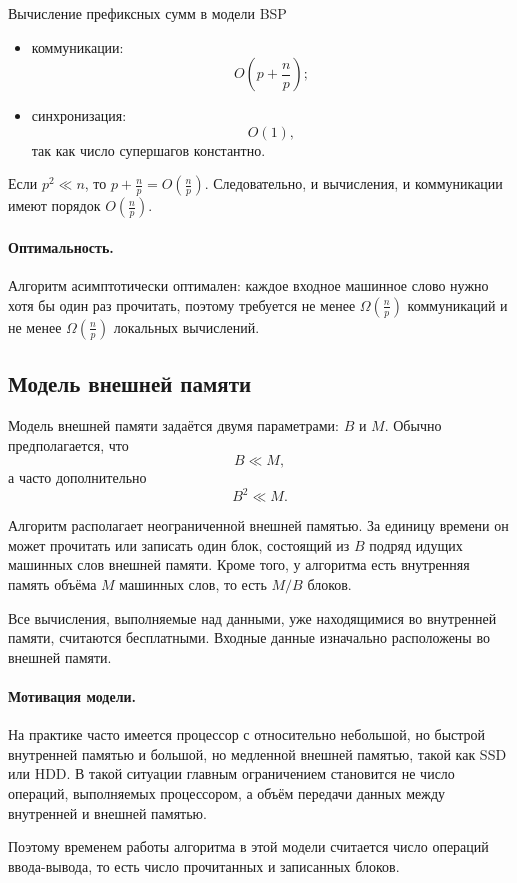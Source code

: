 \begin{Example}{Вычисление префиксных сумм в модели BSP}{}
\begin{itemize}
		\item коммуникации:
		\[
		O\!\left(p+\frac{n}{p}\right);
		\]
		
		\item синхронизация:
		\[
		O(1),
		\]
		так как число супершагов константно.
	\end{itemize}
	
	Если \(p^2 \ll n\), то \(p+\frac{n}{p}=O\!\left(\frac{n}{p}\right)\). Следовательно, и вычисления, и коммуникации имеют порядок \(O\!\left(\frac{n}{p}\right)\).
	
	\paragraph{Оптимальность.}
	Алгоритм асимптотически оптимален: каждое входное машинное слово нужно хотя бы один раз прочитать, поэтому требуется не менее \(\Omega\!\left(\frac{n}{p}\right)\) коммуникаций и не менее \(\Omega\!\left(\frac{n}{p}\right)\) локальных вычислений.
\end{Example}

\subsection{Модель внешней памяти}

Модель внешней памяти задаётся двумя параметрами: \(B\) и \(M\). Обычно предполагается, что
\[
B \ll M,
\]
а часто дополнительно
\[
B^2 \ll M.
\]

Алгоритм располагает неограниченной внешней памятью. За единицу времени он может прочитать или записать один блок, состоящий из \(B\) подряд идущих машинных слов внешней памяти. Кроме того, у алгоритма есть внутренняя память объёма \(M\) машинных слов, то есть \(M/B\) блоков.

Все вычисления, выполняемые над данными, уже находящимися во внутренней памяти, считаются бесплатными. Входные данные изначально расположены во внешней памяти.

\paragraph{Мотивация модели.}
На практике часто имеется процессор с относительно небольшой, но быстрой внутренней памятью и большой, но медленной внешней памятью, такой как SSD или HDD. В такой ситуации главным ограничением становится не число операций, выполняемых процессором, а объём передачи данных между внутренней и внешней памятью.

Поэтому временем работы алгоритма в этой модели считается число операций ввода-вывода, то есть число прочитанных и записанных блоков.


